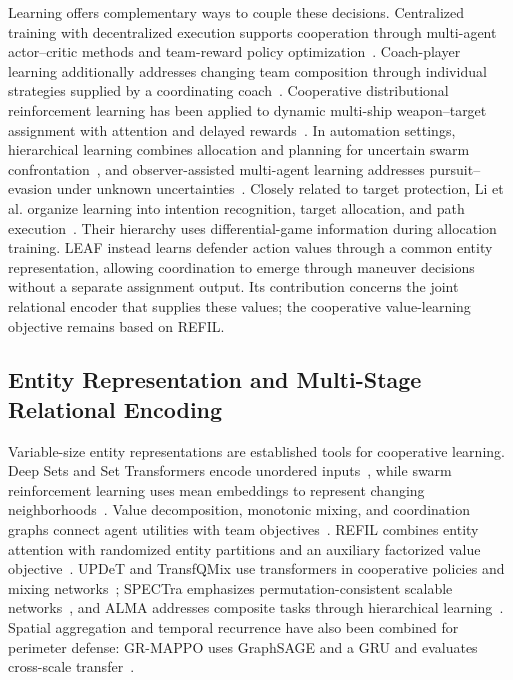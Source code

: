 Learning offers complementary ways to couple these decisions. Centralized training with decentralized execution supports cooperation through multi-agent actor--critic methods and team-reward policy optimization~\cite{lowe2017maddpg,yu2022mappo}. Coach-player learning additionally addresses changing team composition through individual strategies supplied by a coordinating coach~\cite{liu2021copa}. Cooperative distributional reinforcement learning has been applied to dynamic multi-ship weapon--target assignment with attention and delayed rewards~\cite{peng2025wta}. In automation settings, hierarchical learning combines allocation and planning for uncertain swarm confrontation~\cite{wu2025swarm}, and observer-assisted multi-agent learning addresses pursuit--evasion under unknown uncertainties~\cite{liu2025observer}. Closely related to target protection, Li et al. organize learning into intention recognition, target allocation, and path execution~\cite{li2025targetdefense}. Their hierarchy uses differential-game information during allocation training. LEAF instead learns defender action values through a common entity representation, allowing coordination to emerge through maneuver decisions without a separate assignment output. Its contribution concerns the joint relational encoder that supplies these values; the cooperative value-learning objective remains based on REFIL.

\subsection{Entity Representation and Multi-Stage Relational Encoding}
Variable-size entity representations are established tools for cooperative learning. Deep Sets and Set Transformers encode unordered inputs~\cite{zaheer2017deepsets,lee2019settransformer}, while swarm reinforcement learning uses mean embeddings to represent changing neighborhoods~\cite{huttenrauch2019swarm}. Value decomposition, monotonic mixing, and coordination graphs connect agent utilities with team objectives~\cite{sunehag2018vdn,rashid2018qmix,boehmer2020dcg}. REFIL combines entity attention with randomized entity partitions and an auxiliary factorized value objective~\cite{iqbal2021refil}. UPDeT and TransfQMix use transformers in cooperative policies and mixing networks~\cite{hu2021updet,transfqmix2023}; SPECTra emphasizes permutation-consistent scalable networks~\cite{park2026spectra}, and ALMA addresses composite tasks through hierarchical learning~\cite{iqbal2022alma}. Spatial aggregation and temporal recurrence have also been combined for perimeter defense: GR-MAPPO uses GraphSAGE and a GRU and evaluates cross-scale transfer~\cite{tan2026grmappo}.

